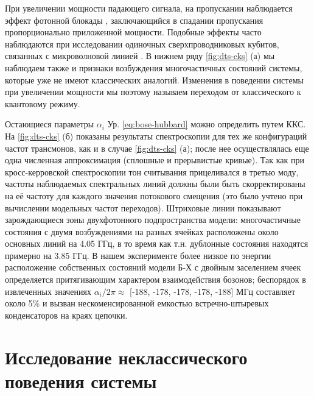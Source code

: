 \documentclass[14pt, a4paper]{extreport}
\numberwithin{equation}{section}
\begin{document}
При увеличении мощности падающего сигнала, на пропускании наблюдается эффект фотонной блокады \cite{birnbaum2005photon}, заключающийся в спадании пропускания пропорционально приложенной мощности. Подобные эффекты часто наблюдаются при исследовании одиночных сверхпроводниковых кубитов, связанных с микроволновой линией \cite{astafiev2010resonance}. В нижнем ряду \autoref{fig:dts-cks} (а) мы наблюдаем также и признаки возбуждения многочастичных состояний системы, которые уже не имеют классических аналогий. Изменения в поведении системы при увеличении мощности мы поэтому называем переходом от классического к квантовому режиму.

Остающиеся параметры $\alpha_i$ Ур. \eqref{eq:bose-hubbard} можно определить путем ККС. На \autoref{fig:dts-cks} (б) показаны результаты спектроскопии для тех же конфигураций частот трансмонов, как и в случае \autoref{fig:dts-cks} (а); после нее осуществлялась еще одна численная аппроксимация (сплошные и прерывистые кривые). Так как при кросс-керровской спектроскопии тон считывания прицеливался в третью моду, частоты наблюдаемых спектральных линий должны были быть скорректированы на её частоту для каждого значения потокового смещения (это было учтено при вычислении модельных частот переходов). Штриховые линии показывают зарождающиеся зоны двухфотонного подпространства модели: многочастичные состояния с двумя возбуждениями на разных ячейках расположены около основных линий на 4.05 ГГц, в то время как т.н. дублонные состояния \cite{gorlach2018simulation} находятся примерно на 3.85 ГГц. В нашем эксперименте более низкое по энергии расположение собственных состояний модели Б-Х с двойным заселением ячеек определяется притягивающим характером взаимодействия бозонов; беспорядок в извлеченных значениях $\alpha_i/2\pi \approx$ [-188, -178, -178, -178, -188] МГц составляет около 5\% и вызван нескоменсированной емкостью встречно-штыревых конденсаторов на краях цепочки. 


\section{Исследование неклассического поведения системы}
\end{document}
